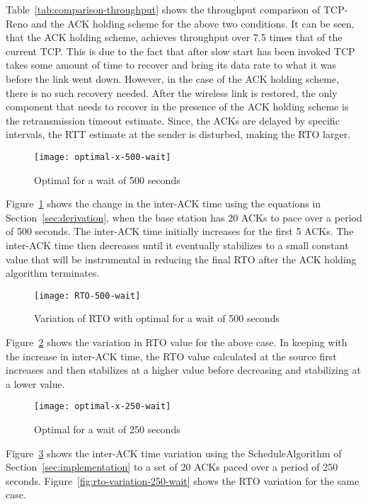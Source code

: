 \documentclass[conference]{IEEEtran}
\begin{document}
Table~\ref{tab:comparison-throughput} shows the throughput comparison of TCP-Reno and the ACK holding scheme for the above two conditions. It can be seen, that the ACK holding scheme, achieves throughput over 7.5 times that of the current TCP. This is due to the fact that after slow start has been invoked TCP takes some amount of time to recover and bring its data rate to what it was before the link went down. However, in the case of the ACK holding scheme, there is no such recovery needed. After the wireless link is restored, the only component that needs to recover in the presence of the ACK holding scheme is the retransmission timeout estimate. Since, the ACKs are delayed by specific intervals, the RTT estimate at the sender is disturbed, making the RTO larger. 
\begin{figure}
  \centering
  \texttt{[image: optimal-x-500-wait]}
  \caption{Optimal  for a wait of 500 seconds}
  \label{fig:optimal-x-500-wait}
\end{figure}

Figure~\ref{fig:optimal-x-500-wait} shows the change in the inter-ACK time using the equations in Section~\ref{sec:derivation}, when the base station has 20 ACKs to pace over a period of 500 seconds. The inter-ACK time initially increases for the first 5 ACKs. The inter-ACK time then decreases until it eventually stabilizes to a small constant value that will be instrumental in reducing the final RTO after the ACK holding algorithm terminates.

\begin{figure}
  \centering
  \texttt{[image: RTO-500-wait]}
  \caption{Variation of RTO with optimal  for a wait of 500 seconds}
  \label{fig:rto-variation-500-wait}
\end{figure}
Figure~\ref{fig:rto-variation-500-wait} shows the variation in RTO value for the above case. In keeping with the increase in inter-ACK time, the RTO value calculated at the source first increases and then stabilizes at a higher value before decreasing and stabilizing at a lower value.
\begin{figure}
  \centering
  \texttt{[image: optimal-x-250-wait]}
  \caption{Optimal  for a wait of 250 seconds}
  \label{fig:optimal-x-250-wait}
\end{figure}
Figure~\ref{fig:optimal-x-250-wait} shows the inter-ACK time variation using the ScheduleAlgorithm of Section~\ref{sec:implementation} to a set of 20 ACKs paced over a period of 250 seconds. Figure~\ref{fig:rto-variation-250-wait} shows the RTO variation for the same case.
\end{document}
